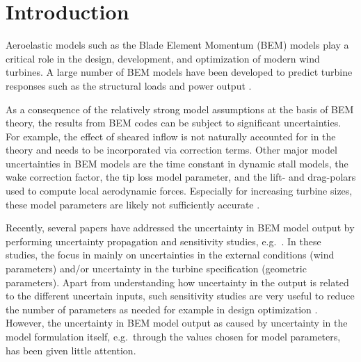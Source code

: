
\section{Introduction}
Aeroelastic models such as the Blade Element Momentum (BEM) models \cite{HandBook} play a critical role in the design, development, and optimization of modern wind turbines. A large number of BEM models have been developed to predict turbine responses such as the structural loads and power output \cite{Vorpahl2013}. 

As a consequence of the relatively strong model assumptions at the basis of BEM theory, the results from BEM codes can be subject to significant uncertainties. For example, the effect of sheared inflow \cite{Madsen2012} is not naturally accounted for in the theory and needs to be incorporated via correction terms. Other major model uncertainties in BEM models are the time constant in dynamic stall models, the wake correction factor, the tip loss model parameter, and the lift- and drag-polars used to compute local aerodynamic forces. Especially for increasing turbine sizes, these model parameters are likely not sufficiently accurate \cite{Sayed2019}. 

Recently, several papers have addressed the uncertainty in BEM model output by performing uncertainty propagation and sensitivity studies, e.g.\ \cite{Echeverria2017,Matthaus2017,Murcia2018,Robertson2018,Bos2019c}. In these studies, the focus in mainly on uncertainties in the external conditions (wind parameters) and/or uncertainty in the turbine specification (geometric parameters). Apart from understanding how uncertainty in the output is related to the different uncertain inputs, such sensitivity studies are very useful to reduce the number of parameters as needed for example in design optimization \cite{Echeverria2017}. However, the uncertainty in BEM model output as caused by uncertainty in the model formulation itself, e.g.\ through the values chosen for model parameters, has been given little attention. %

